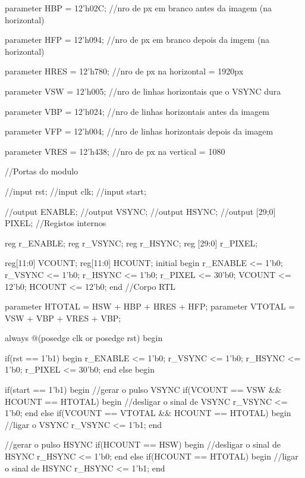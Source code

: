 \quad parameter    HBP = 12'h02C;    //nro de px em branco antes da imagem (na horizontal)

\quad parameter    HFP = 12'h094;    //nro de px em branco depois da imgem (na horizontal)

\quad parameter    HRES = 12'h780;    //nro de px na horizontal = 1920px

\quad parameter    VSW = 12'h005;    //nro de linhas horizontais que o VSYNC dura

\quad parameter    VBP = 12'h024;    //nro de linhas horizontais antes da imagem

\quad parameter    VFP = 12'h004;    //nro de linhas horizontais depois da imagem

\quad parameter    VRES = 12'h438;    //nro de px na vertical = 1080  

//Portas do modulo 

//input	rst;
//input	clk;
//input 	start;

//output	ENABLE;
//output	VSYNC;
//output	HSYNC;
//output	[29;0] PIXEL;
//Registos internos

reg        r\_ENABLE;
reg        r\_VSYNC;
reg        r\_HSYNC;
reg        [29:0] r\_PIXEL;

reg[11:0]    VCOUNT;
reg[11:0]    HCOUNT;  
initial
begin
r\_ENABLE <= 1'b0;
r\_VSYNC <= 1'b0;
r\_HSYNC <= 1'b0;
r\_PIXEL <= 30'b0;
VCOUNT <= 12'b0;
HCOUNT <= 12'b0;
end
//Corpo RTL

parameter    HTOTAL = HSW + HBP + HRES + HFP;
parameter    VTOTAL = VSW + VBP + VRES + VBP;

always @(posedge clk or posedge rst) begin

if(rst == 1'b1) begin
r\_ENABLE    <= 1'b0;
r\_VSYNC        <= 1'b0;
r\_HSYNC        <= 1'b0;
r\_PIXEL        <= 30'b0;
end else begin

if(start == 1'b1) begin
//gerar o pulso VSYNC
if(VCOUNT == VSW \&\& HCOUNT == HTOTAL) begin
//desligar o sinal de VSYNC
r\_VSYNC    <=    1'b0;    
end else if(VCOUNT == VTOTAL \&\& HCOUNT == HTOTAL) begin
//ligar o VSYNC
r\_VSYNC    <=    1'b1;
end

//gerar o pulso HSYNC
if(HCOUNT == HSW) begin 
//desligar o sinal de HSYNC
r\_HSYNC    <= 1'b0;
end else if(HCOUNT == HTOTAL) begin
//ligar o sinal de HSYNC
r\_HSYNC <= 1'b1;
end

